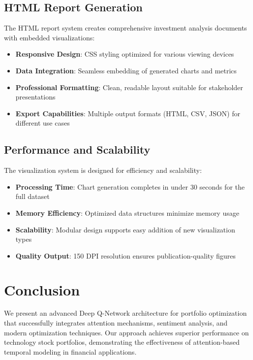 \documentclass[12pt,a4paper]{article}
\begin{document}
\subsection{HTML Report Generation}

The HTML report system creates comprehensive investment analysis documents with embedded visualizations:

\begin{itemize}
\item \textbf{Responsive Design}: CSS styling optimized for various viewing devices
\item \textbf{Data Integration}: Seamless embedding of generated charts and metrics
\item \textbf{Professional Formatting}: Clean, readable layout suitable for stakeholder presentations
\item \textbf{Export Capabilities}: Multiple output formats (HTML, CSV, JSON) for different use cases
\end{itemize}

\subsection{Performance and Scalability}

The visualization system is designed for efficiency and scalability:

\begin{itemize}
\item \textbf{Processing Time}: Chart generation completes in under 30 seconds for the full dataset
\item \textbf{Memory Efficiency}: Optimized data structures minimize memory usage
\item \textbf{Scalability}: Modular design supports easy addition of new visualization types
\item \textbf{Quality Output}: 150 DPI resolution ensures publication-quality figures
\end{itemize}

\section{Conclusion}

We present an advanced Deep Q-Network architecture for portfolio optimization that successfully integrates attention mechanisms, sentiment analysis, and modern optimization techniques. Our approach achieves superior performance on technology stock portfolios, demonstrating the effectiveness of attention-based temporal modeling in financial applications.
\end{document}
